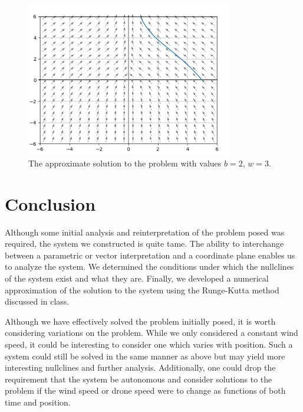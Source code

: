 \documentclass{article}
\begin{document}
    \begin{figure}[H]
        \centering
        \includegraphics[width=0.8\textwidth]{media/overlay2.png}
        \caption{\label{fig:overlay-2} The approximate solution to the problem
        with values $b = 2$, $w = 3$.}
    \end{figure}

    \section{Conclusion}
    Although some initial analysis and reinterpretation of the problem posed was
    required, the system we constructed is quite tame. The ability to
    interchange between a parametric or vector interpretation and a coordinate
    plane enables us to analyze the system. We determined the conditions under
    which the nullclines of the system exist and what they are. Finally, we
    developed a numerical approximation of the solution to the system using the
    Runge-Kutta method discussed in class.

    Although we have effectively solved the problem initially posed, it is worth
    considering variations on the problem. While we only considered a constant
    wind speed, it could be interesting to consider one which varies with
    position. Such a system could still be solved in the same manner as above
    but may yield more interesting nullclines and further analysis.
    Additionally, one could drop the requirement that the system be autonomous
    and consider solutions to the problem if the wind speed or drone speed were
    to change as functions of both time and position.
\end{document}
